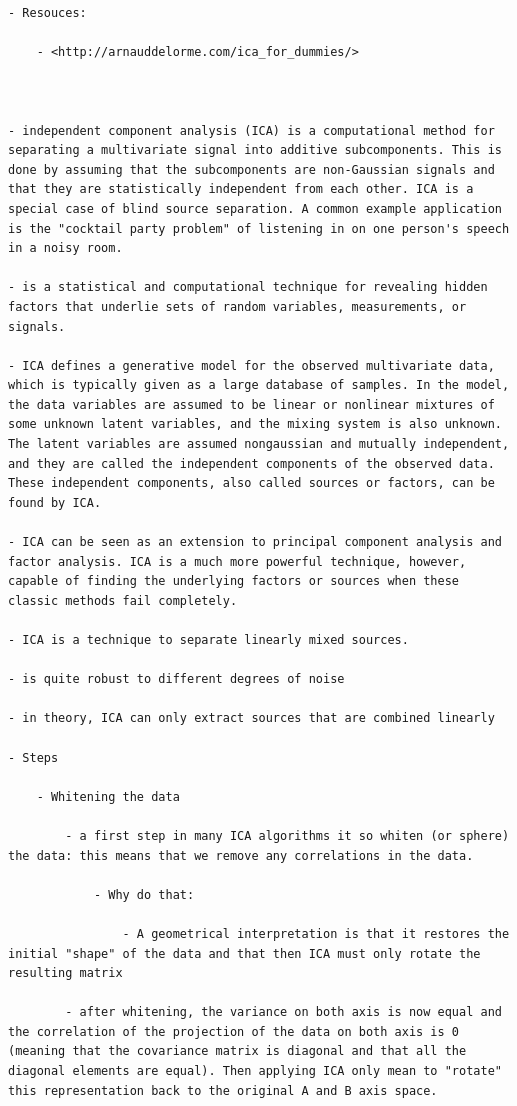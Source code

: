 \documentclass[
]{book}
\begin{document}
\begin{verbatim}
- Resouces:

    - <http://arnauddelorme.com/ica_for_dummies/>



- independent component analysis (ICA) is a computational method for separating a multivariate signal into additive subcomponents. This is done by assuming that the subcomponents are non-Gaussian signals and that they are statistically independent from each other. ICA is a special case of blind source separation. A common example application is the "cocktail party problem" of listening in on one person's speech in a noisy room.

- is a statistical and computational technique for revealing hidden factors that underlie sets of random variables, measurements, or signals.

- ICA defines a generative model for the observed multivariate data, which is typically given as a large database of samples. In the model, the data variables are assumed to be linear or nonlinear mixtures of some unknown latent variables, and the mixing system is also unknown. The latent variables are assumed nongaussian and mutually independent, and they are called the independent components of the observed data. These independent components, also called sources or factors, can be found by ICA.

- ICA can be seen as an extension to principal component analysis and factor analysis. ICA is a much more powerful technique, however, capable of finding the underlying factors or sources when these classic methods fail completely.

- ICA is a technique to separate linearly mixed sources.

- is quite robust to different degrees of noise

- in theory, ICA can only extract sources that are combined linearly

- Steps

    - Whitening the data

        - a first step in many ICA algorithms it so whiten (or sphere) the data: this means that we remove any correlations in the data.

            - Why do that:

                - A geometrical interpretation is that it restores the initial "shape" of the data and that then ICA must only rotate the resulting matrix

        - after whitening, the variance on both axis is now equal and the correlation of the projection of the data on both axis is 0 (meaning that the covariance matrix is diagonal and that all the diagonal elements are equal). Then applying ICA only mean to "rotate" this representation back to the original A and B axis space.


\end{verbatim}
\end{document}

